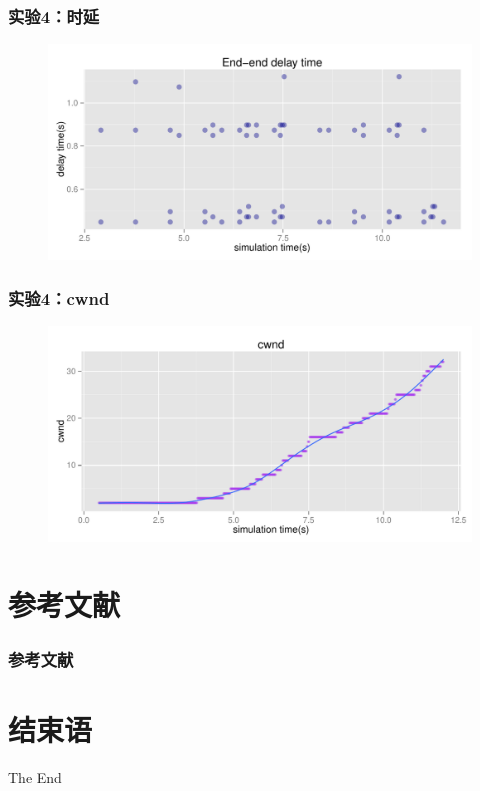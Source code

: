 \documentclass[xcolor={usenames,dvipsnames}]{beamer}
\begin{document}
\begin{frame}
	\frametitle{\textbf{实验}4：\textbf{时延}}
	\begin{figure}
		\includegraphics[width=\textwidth]{pic/plot_router_delay.pdf}
	\end{figure}
\end{frame}

\begin{frame}
	\frametitle{\textbf{实验}4：cwnd}
	\begin{figure}
		\includegraphics[width=\textwidth]{pic/plot_router_cwnd.pdf}
	\end{figure}
\end{frame}

\section{参考文献}
\begin{frame}
\frametitle{\textbf{参考文献}}

\end{frame}

\section{结束语}
\begin{frame}
	\Huge{\centerline{The End}}
\end{frame}

\end{document}
